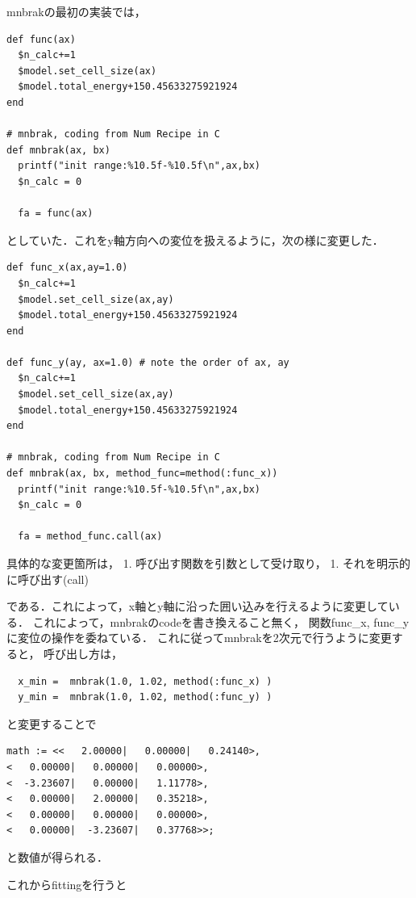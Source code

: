 mnbrakの最初の実装では，

\begin{verbatim}
def func(ax)
  $n_calc+=1
  $model.set_cell_size(ax)
  $model.total_energy+150.45633275921924
end

# mnbrak, coding from Num Recipe in C
def mnbrak(ax, bx)
  printf("init range:%10.5f-%10.5f\n",ax,bx)
  $n_calc = 0

  fa = func(ax)
\end{verbatim}

としていた．これをy軸方向への変位を扱えるように，次の様に変更した．

\begin{verbatim}
def func_x(ax,ay=1.0)
  $n_calc+=1
  $model.set_cell_size(ax,ay)
  $model.total_energy+150.45633275921924
end

def func_y(ay, ax=1.0) # note the order of ax, ay 
  $n_calc+=1
  $model.set_cell_size(ax,ay)
  $model.total_energy+150.45633275921924
end

# mnbrak, coding from Num Recipe in C
def mnbrak(ax, bx, method_func=method(:func_x))
  printf("init range:%10.5f-%10.5f\n",ax,bx)
  $n_calc = 0

  fa = method_func.call(ax)
\end{verbatim}

具体的な変更箇所は， 1. 呼び出す関数を引数として受け取り， 1.
それを明示的に呼び出す(call)

である．これによって，x軸とy軸に沿った囲い込みを行えるように変更している．
これによって，mnbrakのcodeを書き換えること無く， 関数func\_x,
func\_yに変位の操作を委ねている．
これに従ってmnbrakを2次元で行うように変更すると， 呼び出し方は，

\begin{verbatim}
  x_min =  mnbrak(1.0, 1.02, method(:func_x) )
  y_min =  mnbrak(1.0, 1.02, method(:func_y) )
\end{verbatim}

と変更することで

\begin{verbatim}
math := <<   2.00000|   0.00000|   0.24140>,
<   0.00000|   0.00000|   0.00000>,
<  -3.23607|   0.00000|   1.11778>,
<   0.00000|   2.00000|   0.35218>,
<   0.00000|   0.00000|   0.00000>,
<   0.00000|  -3.23607|   0.37768>>;
\end{verbatim}

と数値が得られる．

これからfittingを行うと


